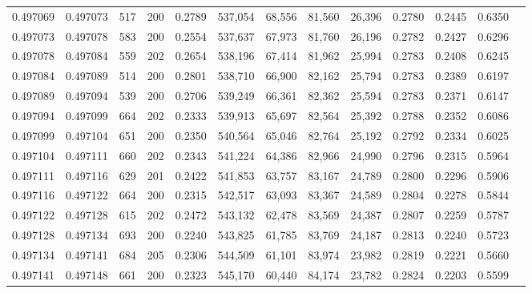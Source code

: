 \begin{tabular}{rrrrrrrrrrrrr}
0.497069 & 0.497073 &   517 & 200 &                                     0.2789 & 537,054 &  68,556 &  81,560 &  26,396 & 0.2780 & 0.2445 & 0.6350 \\
0.497073 & 0.497078 &   583 & 200 &                                     0.2554 & 537,637 &  67,973 &  81,760 &  26,196 & 0.2782 & 0.2427 & 0.6296 \\
0.497078 & 0.497084 &   559 & 202 &                                     0.2654 & 538,196 &  67,414 &  81,962 &  25,994 & 0.2783 & 0.2408 & 0.6245 \\
0.497084 & 0.497089 &   514 & 200 &                                     0.2801 & 538,710 &  66,900 &  82,162 &  25,794 & 0.2783 & 0.2389 & 0.6197 \\
0.497089 & 0.497094 &   539 & 200 &                                     0.2706 & 539,249 &  66,361 &  82,362 &  25,594 & 0.2783 & 0.2371 & 0.6147 \\
0.497094 & 0.497099 &   664 & 202 &                                     0.2333 & 539,913 &  65,697 &  82,564 &  25,392 & 0.2788 & 0.2352 & 0.6086 \\
0.497099 & 0.497104 &   651 & 200 &                                     0.2350 & 540,564 &  65,046 &  82,764 &  25,192 & 0.2792 & 0.2334 & 0.6025 \\
0.497104 & 0.497111 &   660 & 202 &                                     0.2343 & 541,224 &  64,386 &  82,966 &  24,990 & 0.2796 & 0.2315 & 0.5964 \\
0.497111 & 0.497116 &   629 & 201 &                                     0.2422 & 541,853 &  63,757 &  83,167 &  24,789 & 0.2800 & 0.2296 & 0.5906 \\
0.497116 & 0.497122 &   664 & 200 &                                     0.2315 & 542,517 &  63,093 &  83,367 &  24,589 & 0.2804 & 0.2278 & 0.5844 \\
0.497122 & 0.497128 &   615 & 202 &                                     0.2472 & 543,132 &  62,478 &  83,569 &  24,387 & 0.2807 & 0.2259 & 0.5787 \\
0.497128 & 0.497134 &   693 & 200 &                                     0.2240 & 543,825 &  61,785 &  83,769 &  24,187 & 0.2813 & 0.2240 & 0.5723 \\
0.497134 & 0.497141 &   684 & 205 &                                     0.2306 & 544,509 &  61,101 &  83,974 &  23,982 & 0.2819 & 0.2221 & 0.5660 \\
0.497141 & 0.497148 &   661 & 200 &                                     0.2323 & 545,170 &  60,440 &  84,174 &  23,782 & 0.2824 & 0.2203 & 0.5599 \\

\end{tabular}

